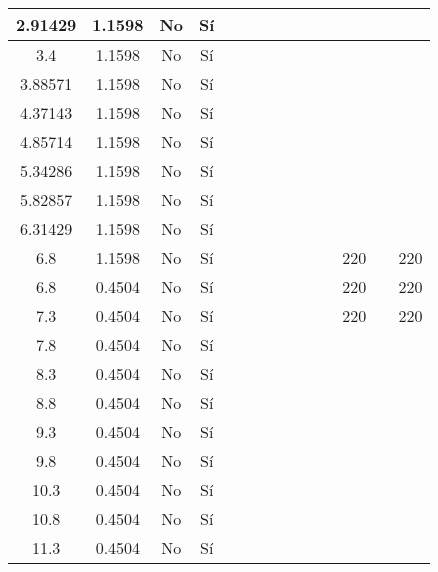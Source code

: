 \begin{table}[H]
{\begin{tabular}{|c|c|c|c|c|c|c|c|c|c|c|c|c|c|}
2.91429 & 1.1598 & No  & Sí  &     &     &     &     &     &     &     &     &     &  \bigstrut\\
\hline
3.4 & 1.1598 & No  & Sí  &     &     &     &     &     &     &     &     &     &  \bigstrut\\
\hline
3.88571 & 1.1598 & No  & Sí  &     &     &     &     &     &     &     &     &     &  \bigstrut\\
\hline
4.37143 & 1.1598 & No  & Sí  &     &     &     &     &     &     &     &     &     &  \bigstrut\\
\hline
4.85714 & 1.1598 & No  & Sí  &     &     &     &     &     &     &     &     &     &  \bigstrut\\
\hline
5.34286 & 1.1598 & No  & Sí  &     &     &     &     &     &     &     &     &     &  \bigstrut\\
\hline
5.82857 & 1.1598 & No  & Sí  &     &     &     &     &     &     &     &     &     &  \bigstrut\\
\hline
6.31429 & 1.1598 & No  & Sí  &     &     &     &     &     &     &     &     &     &  \bigstrut\\
\hline
6.8 & 1.1598 & No  & Sí  &     &     &     &     &     &     &     & 220 &     & 220 \bigstrut\\
\hline
6.8 & 0.4504 & No  & Sí  &     &     &     &     &     &     &     & 220 &     & 220 \bigstrut\\
\hline
7.3 & 0.4504 & No  & Sí  &     &     &     &     &     &     &     & 220 &     & 220 \bigstrut\\
\hline
7.8 & 0.4504 & No  & Sí  &     &     &     &     &     &     &     &     &     &  \bigstrut\\
\hline
8.3 & 0.4504 & No  & Sí  &     &     &     &     &     &     &     &     &     &  \bigstrut\\
\hline
8.8 & 0.4504 & No  & Sí  &     &     &     &     &     &     &     &     &     &  \bigstrut\\
\hline
9.3 & 0.4504 & No  & Sí  &     &     &     &     &     &     &     &     &     &  \bigstrut\\
\hline
9.8 & 0.4504 & No  & Sí  &     &     &     &     &     &     &     &     &     &  \bigstrut\\
\hline
10.3 & 0.4504 & No  & Sí  &     &     &     &     &     &     &     &     &     &  \bigstrut\\
\hline
10.8 & 0.4504 & No  & Sí  &     &     &     &     &     &     &     &     &     &  \bigstrut\\
\hline
11.3 & 0.4504 & No  & Sí  &     &     &     &     &     &     &     &     &     &  \bigstrut\\

\end{tabular}}
\end{table}
